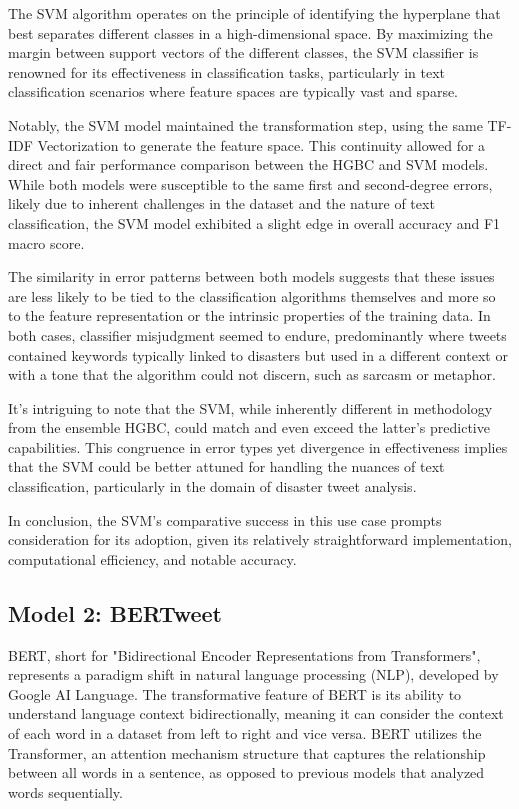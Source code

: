 \documentclass[10pt,table]{article}
\begin{document}
The SVM algorithm operates on the principle of identifying the hyperplane that best separates different classes in a high-dimensional space. By maximizing the margin between support vectors of the different classes, the SVM classifier is renowned for its effectiveness in classification tasks, particularly in text classification scenarios where feature spaces are typically vast and sparse.

Notably, the SVM model maintained the transformation step, using the same TF-IDF Vectorization to generate the feature space. This continuity allowed for a direct and fair performance comparison between the HGBC and SVM models. While both models were susceptible to the same first and second-degree errors, likely due to inherent challenges in the dataset and the nature of text classification, the SVM model exhibited a slight edge in overall accuracy and F1 macro score.

The similarity in error patterns between both models suggests that these issues are less likely to be tied to the classification algorithms themselves and more so to the feature representation or the intrinsic properties of the training data. In both cases, classifier misjudgment seemed to endure, predominantly where tweets contained keywords typically linked to disasters but used in a different context or with a tone that the algorithm could not discern, such as sarcasm or metaphor.

It's intriguing to note that the SVM, while inherently different in methodology from the ensemble HGBC, could match and even exceed the latter's predictive capabilities. This congruence in error types yet divergence in effectiveness implies that the SVM could be better attuned for handling the nuances of text classification, particularly in the domain of disaster tweet analysis.

In conclusion, the SVM's comparative success in this use case prompts consideration for its adoption, given its relatively straightforward implementation, computational efficiency, and notable accuracy.

\subsection{Model 2: BERTweet}
BERT, short for "Bidirectional Encoder Representations from Transformers", represents a paradigm shift in natural language processing (NLP), developed by Google AI Language. The transformative feature of BERT is its ability to understand language context bidirectionally, meaning it can consider the context of each word in a dataset from left to right and vice versa. BERT utilizes the Transformer, an attention mechanism structure that captures the relationship between all words in a sentence, as opposed to previous models that analyzed words sequentially.
\end{document}
